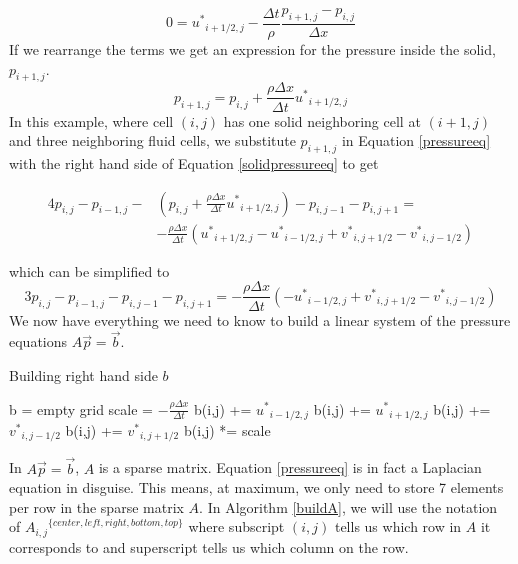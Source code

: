 \begin{equation}
0 = {u^*}_{i+1/2,j} - \frac{\Delta t }{\rho}\frac{p_{i+1,j} - p_{i,j}}{\Delta x}
\label{solidveleq}
\end{equation}
\noindent
If we rearrange the terms we get an expression for the pressure inside the solid, $p_{i+1,j}$.
\begin{equation}
p_{i+1,j} = p_{i,j} + \frac{\rho \Delta x}{\Delta t}{u^*}_{i+1/2,j}
\label{solidpressureeq}
\end{equation}
\noindent
In this example, where cell $(i,j)$ has one solid neighboring cell at $(i+1,j)$ and three neighboring fluid cells, we substitute $p_{i+1,j}$ in Equation \ref{pressureeq} with the right hand side of Equation \ref{solidpressureeq} to get

\begin{equation}
\begin{split}
4p_{i,j} - p_{i-1,j} - &(p_{i,j} + \frac{\rho \Delta x}{\Delta t}{u^*}_{i+1/2,j}) - p_{i,j-1} - p_{i,j+1} = \\ &-\frac{\rho \Delta x}{\Delta t}({u^*}_{i+1/2,j} - {u^*}_{i-1/2,j} + {v^*}_{i,j+1/2} - {v^*}_{i,j-1/2})
\end{split}
\label{solidpressureeqfull}
\end{equation}

which can be simplified to
\begin{equation}
3p_{i,j} - p_{i-1,j} - p_{i,j-1} - p_{i,j+1} = -\frac{\rho \Delta x}{\Delta t}(- {u^*}_{i-1/2,j} + {v^*}_{i,j+1/2} - {v^*}_{i,j-1/2})
\end{equation}
\noindent
We now have everything we need to know to build a linear system of the pressure equations $A\vec{p} = \vec{b}$.

\begin{algorithm}
\caption{Building right hand side $b$}
\begin{algorithmic}
\STATE b = empty grid
\STATE scale = $-\frac{\rho\Delta x}{\Delta t}$
\STATE b(i,j) += ${u^*}_{i-1/2,j}$
\ENDIF
{}
\STATE b(i,j) += ${u^*}_{i+1/2,j}$
\ENDIF
{}
\STATE b(i,j) += ${v^*}_{i,j-1/2}$
\ENDIF
{}
\STATE b(i,j) += ${v^*}_{i,j+1/2}$
\ENDIF
\STATE b(i,j) *= scale
\ENDFOR
\ENDFOR
\end{algorithmic}
\label{build rhs}
\end{algorithm}

In $A\vec{p} = \vec{b}$, $A$ is a sparse matrix. Equation \ref{pressureeq} is in fact a Laplacian equation in disguise. This means, at maximum, we only need to store 7 elements per row in the sparse matrix $A$. In Algorithm \ref{buildA}, we will use the notation of ${A_{i,j}}^{\{center, left, right, bottom, top\}}$ where subscript $(i,j)$ tells us which row in $A$ it corresponds to and superscript tells us which column on the row.

